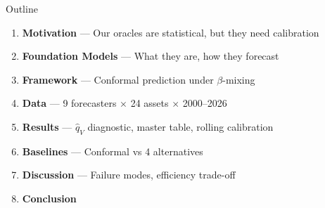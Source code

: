 \documentclass[9pt, aspectratio=169, t]{beamer}
\newcommand{\qV}{\hat{q}_V}
\begin{document}
\begin{frame}{Outline}
	\vspace{-0.2cm}
	{\small
	\begin{enumerate}\setlength{\itemsep}{4pt}
		\item \textbf{Motivation} --- Our oracles are statistical, but they need calibration \checkmark
		\item \textbf{Foundation Models} --- What they are, how they forecast
		\item \textbf{Framework} --- Conformal prediction under $\beta$-mixing
		\item \textbf{Data} --- 9 forecasters $\times$ 24 assets $\times$ 2000--2026
		\item \textbf{Results} --- $\qV$ diagnostic, master table, rolling calibration
		\item \textbf{Baselines} --- Conformal vs 4 alternatives
		\item \textbf{Discussion} --- Failure modes, efficiency trade-off
		\item \textbf{Conclusion}
	\end{enumerate}
	}
\end{frame}


\end{document}
